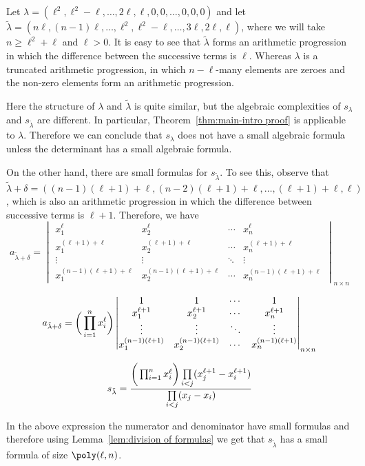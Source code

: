 %

%
%
%
%
%
%
%

\begin{remark}
\label{rem:easy-hard-lambda}
Let $\lambda = (\ell^2, \ell^2-\ell, \ldots, 2\ell, \ell, 0, 0, \ldots, 0,0,0)$ and let $\tilde{\lambda} = ( n\ell, (n-1)\ell, \ldots, \ell^2,\ell^2-\ell, \ldots, 3\ell, 2\ell, \ell)$, where we will take $n \geq \ell^2+\ell$ and $\ell>0$. It is easy to see that $\tilde{\lambda}$ forms an arithmetic progression in which the difference between the successive terms is $\ell$. Whereas $\lambda$ is a truncated arithmetic progression, in which  $n-\ell$-many elements are zeroes and the non-zero elements form an arithmetic progression. 

Here the structure of $\lambda$ and $\tilde{\lambda}$ is quite similar, but the algebraic complexities of $s_\lambda$ and $s_{\tilde{\lambda}}$ are  different. 
In particular, Theorem~\ref{thm:main-intro proof} is applicable to $\lambda$. Therefore we can conclude that $s_\lambda$ does not have a small algebraic formula unless the determinant has a small algebraic formula. 

On the other hand, there are small formulas for $s_{\tilde{\lambda}}$. To see this, observe that 
$\tilde{\lambda}+\delta= ((n-1)(\ell+1)+\ell, (n-2)(\ell+1)+\ell, \ldots, (\ell+1)+\ell, \ell)$, 
which is also an arithmetic progression in which the difference between successive terms is $\ell+1$. Therefore, we have 
\vspace{0.4cm}
$$
a_{\tilde{\lambda}+\delta}=
\begin{vmatrix}x_1^\ell&x_2^\ell&\cdots&x_n^\ell\\x_1^{(\ell+1)+\ell}&x_2^{(\ell+1)+\ell}&\cdots&x_n^{(\ell+1)+\ell}\\\vdots&\vdots&\ddots&\vdots\\x_1^{(n-1)(\ell+1)+\ell}&x_2^{(n-1)(\ell+1)+\ell}&\cdots&x_n^{(n-1)(\ell+1)+\ell}\end{vmatrix}_{n\times n}
$$

\vspace{0.4cm}
$$
a_{\tilde{\lambda}+\delta}= \bigg{(} \prod_{i=1}^{n} x_i^{\ell}\bigg{)}
\begin{vmatrix}1&1&\cdots&1\\x_1^{\ell+1}&x_2^{\ell+1}&\cdots&x_n^{\ell+1}\\\vdots&\vdots&\ddots&\vdots\\x_1^{(n-1)(\ell+1)}&x_2^{(n-1)(\ell+1)}&\cdots&x_n^{(n-1)(\ell+1)}\end{vmatrix}_{n\times n}
$$  

\begin{align*}
s_{\tilde{\lambda}} &= \frac{\bigg{(} \prod_{i=1}^{n} x_i^{\ell}\bigg{)} \prod\limits_{\substack{i<j}} (x_j^{\ell+1}-x_i^{\ell+1})}{\prod\limits_{\substack{i<j}} (x_j-x_i)}\\
\end{align*}

In the above expression the numerator and denominator have small formulas and therefore using Lemma~\ref{lem:division of formulas} we get that $s_{\tilde{\lambda}}$ has a small formula of size $\poly(\ell,n)$.
\end{remark}


